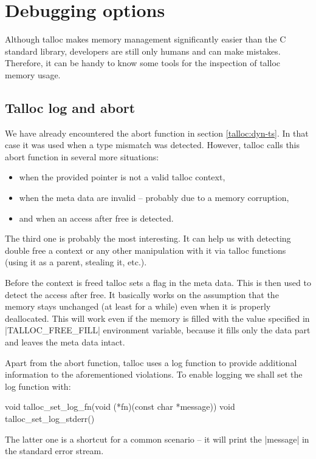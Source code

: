 \section{Debugging options}
\label{talloc:sec:debugging}

Although talloc makes memory management significantly easier than the C standard
library, developers are still only humans and can make mistakes. Therefore, it
can be handy to know some tools for the inspection of talloc memory usage.

\subsection{Talloc log and abort}

We have already encountered the abort function in section \ref{talloc:dyn-ts}.
In that case it was used when a type mismatch was detected. However, talloc
calls this abort function in several more situations:

\begin{itemize}
  \item when the provided pointer is not a valid talloc context,
  \item when the meta data are invalid -- probably due to a memory corruption,
  \item and when an access after free is detected.
\end{itemize}

The third one is probably the most interesting. It can help us with detecting
double free a context or any other manipulation with it via talloc functions
(using it as a parent, stealing it, etc.).

Before the context is freed talloc sets a flag in the meta data. This is then
used to detect the access after free. It basically works on the assumption that
the memory stays unchanged (at least for a while) even when it is properly
deallocated. This will work even if the memory is filled with the value
specified in |TALLOC_FREE_FILL| environment variable, because it fills only
the data part and leaves the meta data intact.

Apart from the abort function, talloc uses a log function to provide additional
information to the aforementioned violations. To enable logging we shall set the
log function with:

\begin{funcproto}
void talloc_set_log_fn(void (*fn)(const char *message))
void talloc_set_log_stderr()
\end{funcproto}
\funclistend
The latter one is a shortcut for a common scenario -- it will print the
|message| in the standard error stream.

